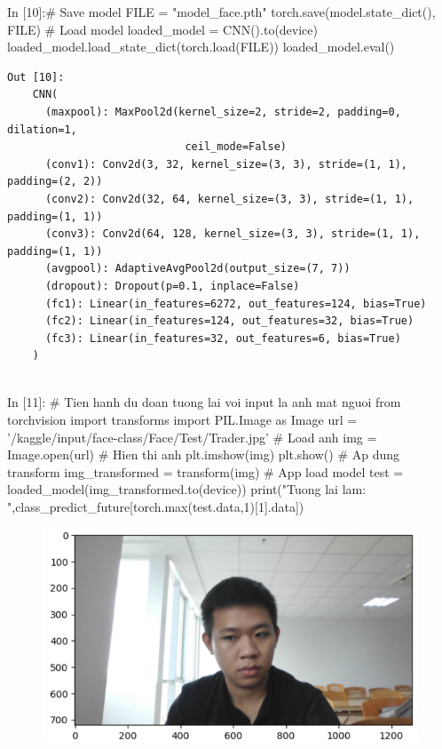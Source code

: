 \documentclass[12pt, a4paper]{article}
\begin{document}
\begin{python}
In [10]:# Save model
        FILE = "model_face.pth"
        torch.save(model.state_dict(), FILE)
        # Load model
        loaded_model = CNN().to(device)
        loaded_model.load_state_dict(torch.load(FILE)) 
        loaded_model.eval()
\end{python}

\begin{verbatim}
Out [10]:
    CNN(
      (maxpool): MaxPool2d(kernel_size=2, stride=2, padding=0, dilation=1,
                            ceil_mode=False)
      (conv1): Conv2d(3, 32, kernel_size=(3, 3), stride=(1, 1), padding=(2, 2))
      (conv2): Conv2d(32, 64, kernel_size=(3, 3), stride=(1, 1), padding=(1, 1))
      (conv3): Conv2d(64, 128, kernel_size=(3, 3), stride=(1, 1), padding=(1, 1))
      (avgpool): AdaptiveAvgPool2d(output_size=(7, 7))
      (dropout): Dropout(p=0.1, inplace=False)
      (fc1): Linear(in_features=6272, out_features=124, bias=True)
      (fc2): Linear(in_features=124, out_features=32, bias=True)
      (fc3): Linear(in_features=32, out_features=6, bias=True)
    )
    
\end{verbatim}

\begin{python}
In [11]: # Tien hanh du doan tuong lai voi input la anh mat nguoi
        from torchvision import transforms
        import PIL.Image as Image
        url = '/kaggle/input/face-class/Face/Test/Trader.jpg'
        # Load anh
        img = Image.open(url)
        # Hien thi anh
        plt.imshow(img)
        plt.show()
        # Ap dung transform
        img_transformed = transform(img)
        # App load model
        test = loaded_model(img_transformed.to(device))
        print("Tuong lai lam: ",class_predict_future[torch.max(test.data,1)[1].data])
\end{python}


\begin{figure}[h] %
    \includegraphics[scale = 0.55]{Img/Pre_Fut/P3.png}
\end{figure}
\end{document}
